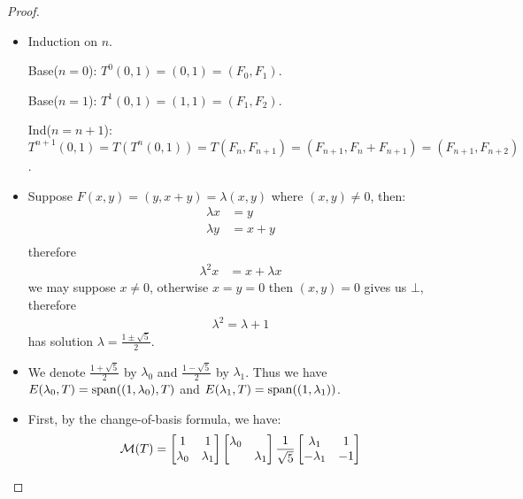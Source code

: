 \documentclass[../main.tex]{subfiles}
\begin{document}
\begin{proof}
  ~
  \begin{itemize}
    \item Induction on $n$.
    
          Base($n = 0$): $T^0(0, 1) = (0, 1) = (F_0, F_1)$.

          Base($n = 1$): $T^1(0, 1) = (1, 1) = (F_1, F_2)$.

          Ind($n = n + 1$): $T^{n + 1}(0, 1) = T(T^n(0, 1)) = T(F_n, F_{n + 1}) = (F_{n + 1}, F_n + F_{n + 1}) = (F_{n + 1}, F_{n + 2})$.
    \item Suppose $F(x, y) = (y, x + y) = \lambda (x, y)$ where $(x, y) \neq 0$, then:
          \begin{align*}
            \lambda x & = y \\
            \lambda y & = x + y \\
          \end{align*}
          therefore
          \begin{align*}
            \lambda^2 x &= x + \lambda x
          \end{align*}
          we may suppose $x \neq 0$, otherwise $x = y = 0$ then $(x, y) = 0$ gives us $\bot$,
          therefore
          \begin{align*}
            \lambda^2 = \lambda + 1
          \end{align*}
          has solution $\lambda = \frac{1 \pm \sqrt{5}}{2}$.
    \item We denote $\frac{1 + \sqrt{5}}{2}$ by $\lambda_0$ and $\frac{1 - \sqrt{5}}{2}$ by $\lambda_1$.
          Thus we have $E(\lambda_0, T) = \operatorname{span}((1, \lambda_0), T)$ and $E(\lambda_1, T) = \operatorname{span}((1, \lambda_1))$.
    \item First, by the change-of-basis formula, we have:
          \[
            \mathcal{M}(T) = \begin{bmatrix}
              1 & 1 \\
              \lambda_0 & \lambda_1 \\
            \end{bmatrix}
            \begin{bmatrix}
              \lambda_0 & \\
              & \lambda_1 \\
            \end{bmatrix}
            \frac{1}{\sqrt{5}}
            \begin{bmatrix}
              \lambda_1 & 1 \\
              - \lambda_1 & - 1 \\

\end{bmatrix}\]
\end{itemize}
\end{proof}
\end{document}

